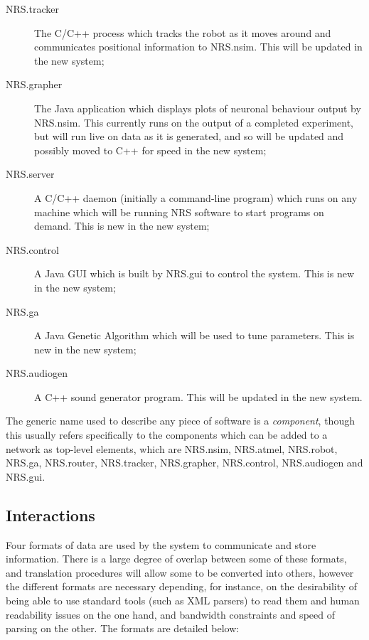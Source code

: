 \documentclass[pdftex,a4paper]{article}
\begin{document}
\begin{description}
\item[NRS.tracker] The C/C++ process which tracks the robot as it
  moves around and communicates positional information to
  NRS.nsim. This will be updated in the new system;

\item[NRS.grapher] The Java application which displays plots of
  neuronal behaviour output by NRS.nsim. This currently runs on the
  output of a completed experiment, but will run live on data as it is
  generated, and so will be updated and possibly moved to C++ for
  speed in the new system;

\item[NRS.server] A C/C++ daemon (initially a command-line program)
  which runs on any machine which will be running NRS software to
  start programs on demand. This is new in the new system;

\item[NRS.control] A Java GUI which is built by NRS.gui to control
  the system. This is new in the new system;

\item[NRS.ga] A Java Genetic Algorithm which will be used to tune
  parameters. This is new in the new system;

\item[NRS.audiogen] A C++ sound generator program. This will be
  updated in the new system.

\end{description}

The generic name used to describe any piece of software is a {\em
component}, though this usually refers specifically to the components
which can be added to a network as top-level elements, which are
NRS.nsim, NRS.atmel, NRS.robot, NRS.ga, NRS.router, NRS.tracker,
NRS.grapher, NRS.control, NRS.audiogen and NRS.gui.

\subsection{Interactions}

Four formats of data are used by the system to communicate and store
information. There is a large degree of overlap between some of these
formats, and translation procedures will allow some to be converted
into others, however the different formats are necessary depending,
for instance, on the desirability of being able to use standard tools
(such as XML parsers) to read them and human readability issues on the
one hand, and bandwidth constraints and speed of parsing on the
other. The formats are detailed below:
\end{document}

